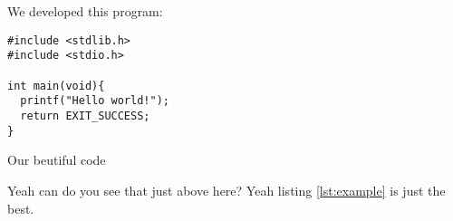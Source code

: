 \chapter{\solutionname}
We developed this program:

\begin{listing}[H]
\begin{verbatim}
#include <stdlib.h>
#include <stdio.h>

int main(void){
  printf("Hello world!");
  return EXIT_SUCCESS;
}
\end{verbatim}
\caption{Our beutiful code}
\label{lst:example}
\end{listing}

Yeah can do you see that just above here?
Yeah listing \ref{lst:example} is just the best.
